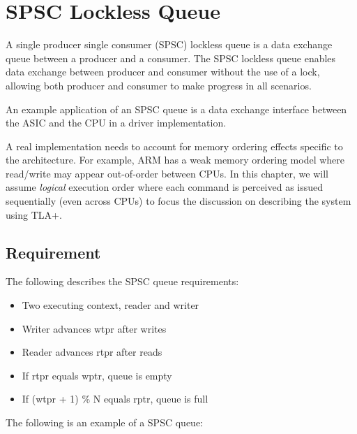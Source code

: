 % 

\chapter{SPSC Lockless Queue}


A single producer single consumer (SPSC) lockless queue is a data exchange queue
between a producer and a consumer. The SPSC lockless queue enables data exchange
between producer and consumer without the use of a lock, allowing both producer
and consumer to make progress in all scenarios.\newline

An example application of an SPSC queue is a data exchange interface between the ASIC
and the CPU in a driver implementation.\newline

A real implementation needs to account for memory ordering effects specific to
the architecture. For example, ARM has a weak memory ordering model where
read/write may appear out-of-order between CPUs. In this chapter, we will assume
\textit{logical} execution order where each command is perceived as issued
sequentially (even across CPUs) to focus the discussion on describing the system
using TLA+.
\newline

\section{Requirement}

The following describes the SPSC queue requirements: 

\begin{itemize}
    \item Two executing context, reader and writer
    \item Writer advances wtpr after writes
    \item Reader advances rtpr after reads
    \item If rtpr equals wptr, queue is empty
    \item If (wtpr + 1) \% N equals rptr, queue is full
\end{itemize}

The following is an example of a SPSC queue:
\begin{center}
\end{center}

